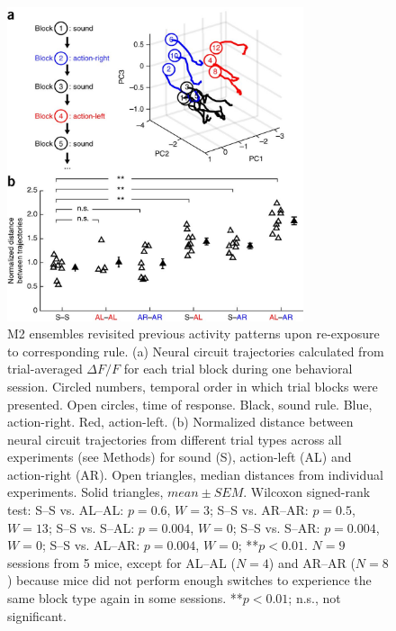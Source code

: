 \begin{figure}[htbp]

\begin{center}
\includegraphics[width=8.7cm]{Figures/Chapter3/NN_fig6} %
\end{center}

\caption[M2 ensembles revisited previous activity patterns upon re-exposure to corresponding rule]
{
M2 ensembles revisited previous activity patterns upon re-exposure to corresponding rule.
(a) Neural circuit trajectories calculated from trial-averaged $\Delta F/F$ for each trial block during one behavioral session. Circled numbers, temporal order in which trial blocks were presented. Open circles, time of response. Black, sound rule. Blue, action-right. Red, action-left. (b) Normalized distance between neural circuit trajectories from different trial types across all experiments (see Methods) for sound (S), action-left (AL) and action-right (AR). Open triangles, median distances from individual experiments. Solid triangles, $\mathit{mean}\pm\mathit{SEM}$. Wilcoxon signed-rank test: S--S vs. AL--AL: $p = 0.6$, $W = 3$; S--S vs. AR--AR: $p = 0.5$, $W = 13$; S--S vs. S--AL: $p = 0.004$, $W = 0$; S--S vs. S--AR: $p = 0.004$, $W = 0$; S--S vs. AL--AR: $p = 0.004$, $W = 0$; **$p < 0.01$. $N = 9$ sessions from 5 mice, except for AL--AL ($N = 4$) and AR--AR ($N = 8$) because mice did not perform enough switches to experience the same block type again in some sessions. **$p < 0.01$; n.s., not significant.
}

\label{fig:NN_fig6}
\end{figure}